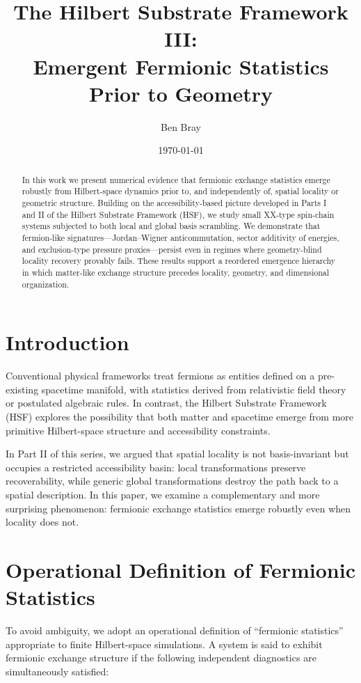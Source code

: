 \documentclass[11pt]{article}
\title{The Hilbert Substrate Framework III:\\ Emergent Fermionic Statistics Prior to Geometry}
\author{Ben Bray}
\date{\today}
\begin{document}
\maketitle

\begin{abstract}
In this work we present numerical evidence that fermionic exchange statistics emerge robustly from Hilbert-space dynamics prior to, and independently of, spatial locality or geometric structure. Building on the accessibility-based picture developed in Parts I and II of the Hilbert Substrate Framework (HSF), we study small XX-type spin-chain systems subjected to both local and global basis scrambling. We demonstrate that fermion-like signatures—Jordan--Wigner anticommutation, sector additivity of energies, and exclusion-type pressure proxies—persist even in regimes where geometry-blind locality recovery provably fails. These results support a reordered emergence hierarchy in which matter-like exchange structure precedes locality, geometry, and dimensional organization.
\end{abstract}

\section{Introduction}
Conventional physical frameworks treat fermions as entities defined on a pre-existing spacetime manifold, with statistics derived from relativistic field theory or postulated algebraic rules. In contrast, the Hilbert Substrate Framework (HSF) explores the possibility that both matter and spacetime emerge from more primitive Hilbert-space structure and accessibility constraints.

In Part II of this series, we argued that spatial locality is not basis-invariant but occupies a restricted accessibility basin: local transformations preserve recoverability, while generic global transformations destroy the path back to a spatial description. In this paper, we examine a complementary and more surprising phenomenon: fermionic exchange statistics emerge robustly even when locality does not.

\section{Operational Definition of Fermionic Statistics}
To avoid ambiguity, we adopt an operational definition of ``fermionic statistics'' appropriate to finite Hilbert-space simulations. A system is said to exhibit fermionic exchange structure if the following independent diagnostics are simultaneously satisfied:
\end{document}
